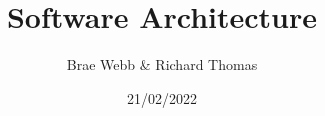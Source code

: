 \documentclass{csse4400}
\title{Software Architecture}
\author{Brae Webb \& Richard Thomas}
\date{21/02/2022}
\begin{document}
\makecover





\end{document}
